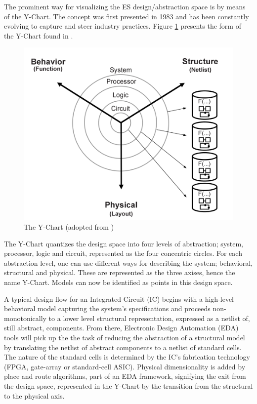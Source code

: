 \documentclass[12pt,twoside]{article}
\begin{document}
The prominent way for visualizing the ES design/abstraction space is by means of the Y-Chart.
The concept was first presented in 1983 \cite{Gajski1983} and has been constantly evolving to capture and steer industry practices.
Figure \ref{fig:Y-Chart} presents the form of the Y-Chart found in \cite{Gajski2009}.

\begin{figure}[htb]
\centering
\includegraphics[scale=.45]{Figures/y-chart.png}
\caption{\label{fig:Y-Chart}The Y-Chart (adopted from \cite{Gajski2009})}
\end{figure}


The Y-Chart quantizes the design space into four levels of abstraction; system, processor, logic and circuit, represented as the four concentric circles.
For each abstraction level, one can use different ways for describing the system; behavioral, structural and physical.
These are represented as the three axises, hence the name Y-Chart.
Models can now be identified as points in this design space.

A typical design flow for an Integrated Circuit (IC) begins with a high-level behavioral model capturing the system's specifications and 
proceeds non-monotonically to a lower level structural representation, expressed as a netlist of, still abstract, components.
From there, Electronic Design Automation (EDA) tools will pick up the the task of reducing the abstraction of a structural model by translating the netlist of abstract components to a netlist of standard cells.
The nature of the standard cells is determined by the IC's fabrication technology (FPGA, gate-array or standard-cell ASIC).
Physical dimensionality is added by place and route algorithms, 
part of an EDA framework, 
signifying the exit from the design space, 
represented in the Y-Chart by the transition from the structural to the physical axis.
\end{document}
